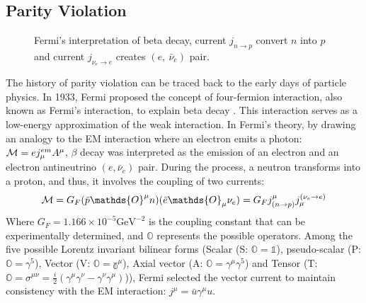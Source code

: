 \subsection{Parity Violation}
\begin{figure}[!h]
    \centering
    \caption{Fermi's interpretation of beta decay, current $j_{n \rightarrow p}$ 
    convert $n$ into $p$ and current $j_{\nu_e \rightarrow e}$ creates $(e, \ \bar{\nu}_e) $
    pair.}
\end{figure}
The history of parity violation can be traced back to the early days of particle physics. 
In 1933, Fermi proposed the concept of four-fermion interaction, also known as 
Fermi's interaction, to explain beta decay \cite{Fermi1934}. 
This interaction serves as a low-energy approximation of the weak interaction. 
In Fermi's theory, by drawing an analogy to the EM interaction where an electron
emits a photon: $\mathcal{M} = ej_\mu^{em} A^\mu$, $\beta$ decay was interpreted 
as the emission of an electron and an electron antineutrino $(e, \bar{\nu}_e)$ pair. 
During the process, a neutron transforms into a proton, and thus, it involves 
the coupling of two currents:
\begin{equation}
    \CM = G_F (\bar{p} \mathds{O}^\mu n)(\bar{e} \mathds{O}_\mu \nu_e) 
	= G_F j^\mu_{(n\rightarrow p)} j_\mu^{(\nu_e\rightarrow e)}
\end{equation}
Where $G_F = 1.166 \times 10^{-5} \mathrm{GeV}^{-2}$ is the coupling constant that 
can be experimentally determined, and $\mathds{O}$ represents 
the possible operators. Among the five possible Lorentz invariant bilinear forms 
(Scalar (S: $\mathds{O} = \mathds{1}$), pseudo-scalar (P: $\mathds{O} = \gamma^5$), 
Vector (V: $\mathds{O} = \mathds{\gamma^\mu}$), Axial vector (A: $\mathds{O} = \gamma^\mu\gamma^5$) 
and Tensor (T: $\mathds{O}=\sigma^{\mu\nu} = \frac{i}{2}(\gamma^\mu\gamma^\nu - \gamma^\nu\gamma^\mu)$)),
Fermi selected the vector current to maintain consistency with the EM interaction:
$j^\mu = \bar{u} \gamma^\mu u$.

